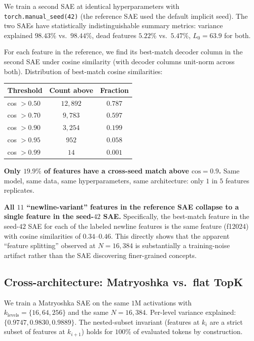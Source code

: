 \documentclass[11pt]{article}
\begin{document}
We train a second SAE at identical hyperparameters with
\texttt{torch.manual\_seed(42)} (the reference SAE used the default
implicit seed). The two SAEs have statistically indistinguishable summary
metrics: variance explained $98.43\%$ vs.\ $98.44\%$, dead features
$5.22\%$ vs.\ $5.47\%$, $L_0 = 63.9$ for both.

For each feature in the reference, we find its best-match decoder column
in the second SAE under cosine similarity (with decoder columns unit-norm
across both). Distribution of best-match cosine similarities:

\begin{center}
\begin{tabular}{lcc}
\toprule
Threshold & Count above & Fraction \\
\midrule
cos $> 0.50$ & $12{,}892$ & $0.787$ \\
cos $> 0.70$ & $9{,}783$ & $0.597$ \\
cos $> 0.90$ & $3{,}254$ & $\mathbf{0.199}$ \\
cos $> 0.95$ & $952$ & $0.058$ \\
cos $> 0.99$ & $14$ & $0.001$ \\
\bottomrule
\end{tabular}
\end{center}

\textbf{Only $19.9\%$ of features have a cross-seed match above
$\text{cos} = 0.9$.} Same model, same data, same hyperparameters, same
architecture: only $1$ in $5$ features replicates.

\textbf{All $11$ ``newline-variant'' features in the reference SAE collapse
to a single feature in the seed-$42$ SAE.} Specifically, the
best-match feature in the seed-$42$ SAE for each of the labeled newline
features is the same feature (f12024) with cosine similarities of
$0.34$--$0.46$. This directly shows that the apparent ``feature splitting''
observed at $N = 16{,}384$ is substantially a training-noise artifact
rather than the SAE discovering finer-grained concepts.

\subsection{Cross-architecture: Matryoshka vs.\ flat TopK}
\label{sec:matryoshka}

We train a Matryoshka SAE \cite{bussmann2025matryoshka} on the same
$1\text{M}$ activations with $k_{\text{levels}} = \{16, 64, 256\}$ and
the same $N = 16{,}384$. Per-level variance explained:
$\{0.9747, 0.9830, 0.9889\}$. The nested-subset invariant
(features at $k_i$ are a strict subset of features at $k_{i+1}$) holds
for $100\%$ of evaluated tokens by construction.
\end{document}
